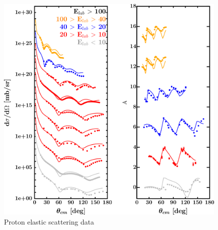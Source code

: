 \begin{figure}[H]
    \centering
    \begin{minipage}{0.45\textwidth}
        \centering
        \includegraphics[width=1.0\textwidth]{figures/ni64_protonElastic.png}
        \caption{Proton elastic scattering data}
        \label{DOMFitData_ni64_proton_elastic}
    \end{minipage}\hfill
    \begin{minipage}{0.45\textwidth}
        \centering

\end{minipage}
\end{figure}
